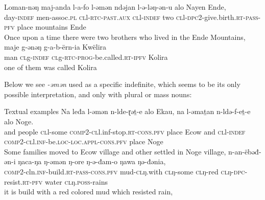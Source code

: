 

\ea 
\ea \gll Loman-nǝŋ maj-anda l-a-fo l-ǝmǝn ndǝjan l-ǝ-lǝŋ-ǝn-u alo Nayen Ende,\\
day-\textsc{indef} men-assoc.\textsc{pl} \textsc{cl}l-\textsc{rtc}-\textsc{past.aux} \textsc{cl}l-\textsc{indef} two \textsc{cl}l-\textsc{dpc}2-give.birth.\textsc{rt}-\textsc{pass}-\textsc{pfv} place mountains Ende\\
	\glt Once upon a time there were two brothers who lived in the Ende Mountains,
	\ex \gll maje g-ǝnǝŋ g-a-b-ërn-ia Kwëlira\\
man \textsc{cl}g-\textsc{indef} \textsc{cl}g-\textsc{rtc}-\textsc{prog}-be.called.\textsc{rt}-\textsc{ipfv} Kolira\\
\glt one of them was called Kolira
\z
\z 

Below we see \textit{-əmən} used as a specific indefinite, which seems to be its only possible interpretation, and only with plural or mass nouns:

\ea Textual examples
\ea \gll  Na leđa l-ǝmǝn n-lde-ɽǝṯ-e alo Ekau, na l-ǝmaṯan n-ldǝ-f-eṯ-e alo Noge.\\
and people \textsc{cl}l-some \textsc{comp}2-\textsc{cl}l.inf-stop.\textsc{rt}-\textsc{cons}.\textsc{pfv} place Ecow and \textsc{cl}l-\textsc{indef} \textsc{comp}2-\textsc{cl}l.\textsc{inf}-be.\textsc{loc}-\textsc{loc}.\textsc{appl}-\textsc{cons}.\textsc{pfv} place Noge\\
\glt Some families moved to Ecow village and other settled in Noge village,
	\ex \gll n-an-ëbəđ-ən-i ŋaca-ŋa ŋ-əmən ŋ-ore ŋ-ə-đam-o ŋawa ŋə-đənia,\\
\textsc{comp}2-cln.\textsc{inf}-build.\textsc{rt}-\textsc{pass}-\textsc{cons}.\textsc{pfv} mud-\textsc{cl}ŋ.with \textsc{cl}ŋ-some \textsc{cl}ŋ-red \textsc{cl}ŋ-\textsc{dpc}-resist.\textsc{rt}-\textsc{pfv} water \textsc{cl}ŋ.\textsc{poss}-rains\\
\glt it is build with a red colored mud which resisted rain,
\z 
\z 

